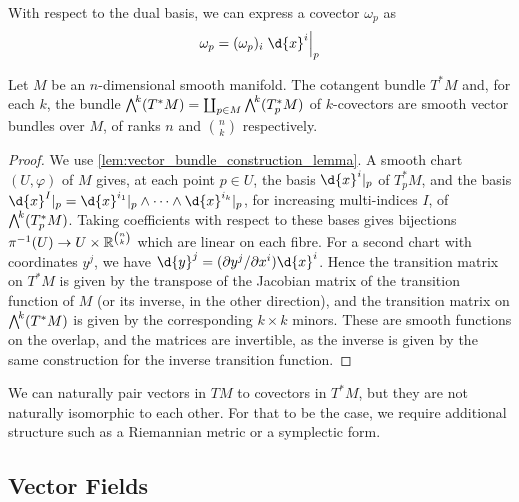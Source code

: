 \documentclass[a4paper,12pt]{article}
\begin{document}
With respect to the dual basis, we can express a covector $\omega_p$ as
\begin{equation}
    \omega_p = (\omega_p)_i \eval{\d{x}^i}{p}
\end{equation}
\begin{proposition}\label{prop:cotangent_bundle_and_exterior_powers_are_vector_bundles}
    Let $M$ be an $n$-dimensional smooth manifold.
    The cotangent bundle $T^*M$ and, for each $k$, the bundle $\extp^k(T^*M) = \coprod_{p \in M} \extp^k(T^*_p M)$ of $k$-covectors are smooth vector bundles over $M$, of ranks $n$ and $\binom{n}{k}$ respectively.
\end{proposition}
\begin{proof}
    We use \cref{lem:vector_bundle_construction_lemma}.
    A smooth chart $(U, \varphi)$ of $M$ gives, at each point $p \in U$, the basis $\d{x}^i|_p$ of $T^*_p M$, and the basis $\d{x}^I|_p = \d{x}^{i_1}|_p \wedge \cdots \wedge \d{x}^{i_k}|_p$, for increasing multi-indices $I$, of $\extp^k(T^*_p M)$.
    Taking coefficients with respect to these bases gives bijections $\pi^{-1}(U) \to U \times \mathbb{R}^{\binom{n}{k}}$ which are linear on each fibre.
    For a second chart with coordinates $y^j$, we have $\d{y}^j = (\partial y^j/\partial x^i) \d{x}^i$.
    Hence the transition matrix on $T^*M$ is given by the transpose of the Jacobian matrix of the transition function of $M$ (or its inverse, in the other direction), and the transition matrix on $\extp^k(T^*M)$ is given by the corresponding $k \times k$ minors.
    These are smooth functions on the overlap, and the matrices are invertible, as the inverse is given by the same construction for the inverse transition function.
\end{proof}
We can naturally pair vectors in $TM$ to covectors in $T^*M$, but they are not naturally isomorphic to each other.
For that to be the case, we require additional structure such as a Riemannian metric or a symplectic form.


\subsection{Vector Fields}\label{subsec:manifolds:vector_fields}
\end{document}
